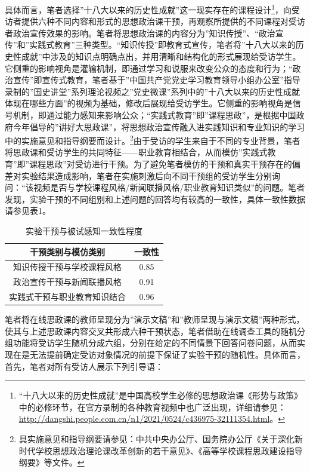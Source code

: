 \documentclass[
  12pt,
]{ctexart}
\begin{document}
具体而言，笔者选择''十八大以来的历史性成就''这一现实存在的课程设计\footnote{``十八大以来的历史性成就''是中国高校学生必修的思想政治课《形势与政策》中的必修环节，在官方录制的各种教育视频中也广泛出现，详细请参见：\url{http://dangshi.people.com.cn/n1/2021/0524/c436975-32111354.html}。}，向受访者提供六种不同内容和形式的思想政治课干预，再观察所提供的不同课程对受访者政治宣传效果的影响。笔者将思想政治课的内容分为''知识传授''、``政治宣传''和''实践式教育''三种类型。``知识传授''即教育式宣传，笔者将''十八大以来的历史性成就''中涉及的知识点明确点出，并用清晰和结构化的形式展现给受访学生。它侧重的影响视角是灌输机制，即通过学习和说服来改变公众的态度和行为；``政治宣传''即宣传式教育，笔者基于''中国共产党党史学习教育领导小组办公室''指导录制的''国史讲堂''系列理论视频之''党史微课''系列中的''十八大以来的历史性成就体现在哪些方面''的视频为基础，修改后展现给受访学生。它侧重的影响视角是信号机制，即通过能力感知来影响公众；``实践式教育''即''课程思政''，是根据中国政府今年倡导的''讲好大思政课''，将思想政治宣传融入进实践知识和专业知识的学习中的实施意见和指导纲要而设计。\footnote{具实施意见和指导纲要请参见：中共中央办公厅、国务院办公厅《关于深化新时代学校思想政治理论课改革创新的若干意见》、《高等学校课程思政建设指导纲要》等文件。}由于受访的学生来自于不同的专业背景，笔者将思政课和受访学生的共同特征------职业教育相结合，从而模仿''实践式教育''即''课程思政''对受访进行干预。为了避免笔者模仿的干预和真实干预存在的偏差对实验结果造成影响，笔者在实施刺激后向不同干预组的受访学生分别询问：``该视频是否与学校课程风格/新闻联播风格/职业教育知识类似''的问题。笔者发现，实验干预的不同组别和上述问题的回答均有较高的一致性，具体一致性数据请参见表1。

\begin{table}[!h]

\caption{\label{tab:unnamed-chunk-3}实验干预与被试感知一致性程度}
\centering
\begin{tabular}[t]{cc}
\toprule
干预类别与模仿类别 & 一致性\\
\midrule
知识传授干预与学校课程风格 & 0.85\\
政治宣传干预与新闻联播风格 & 0.91\\
实践式干预与职业教育知识结合 & 0.96\\
\bottomrule
\end{tabular}
\end{table}

笔者将在线思政课的教师呈现分为''演示文稿''和''教师呈现与演示文稿''两种形式，使其与上述思政课内容交叉共形成六种干预状态，笔者借助在线调查工具的随机分组功能将受访学生随机分成六组，分别在给定的不同情景下回答问卷问题，从而实现在是无法提前确定受访对象情况的前提下保证了实验干预的随机性。具体而言，首先，笔者对所有受访人展示下列引导语：
\end{document}
